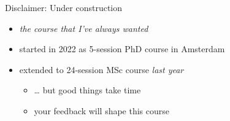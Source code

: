 \documentclass[aspectratio=169,mathserif]{beamer}
\begin{document}
\begin{frame}{Disclaimer: Under construction}

        \begin{itemize}
        \item \emph{the course that I've always wanted}
        \item started in 2022 as 5-session PhD course in Amsterdam
        \item extended to 24-session MSc course \emph{last year} 
        \begin{itemize}
          \item \dots{} but good things take time
          \item your feedback will shape this course     
        \end{itemize} 
        \end{itemize}

\end{frame}
\end{document}
